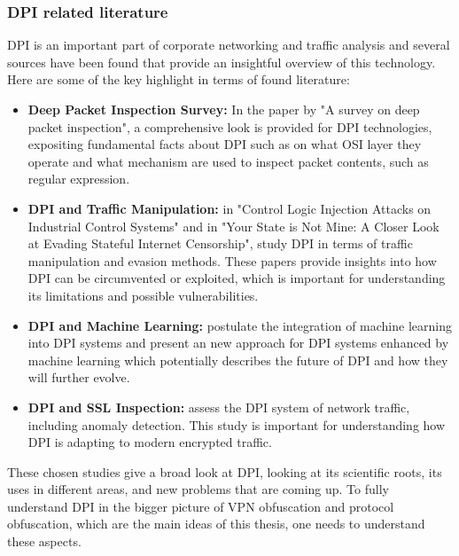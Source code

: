 \documentclass[12pt, fleqn, a4paper]{article}
\begin{document}
\subsubsection{DPI related literature}
DPI is an important part of corporate networking and traffic analysis and several sources have been found that provide an insightful overview of this technology. Here are some of the key highlight in terms of found literature:
\begin{itemize}
  \item \textbf{Deep Packet Inspection Survey:} In the paper by \cite{DPL} "A survey on deep packet inspection", a comprehensive look is provided for DPI technologies, expositing fundamental facts about DPI such as on what OSI layer they operate and what mechanism are used to inspect packet contents, such as regular expression.
  \item \textbf{DPI and Traffic Manipulation:} \cite{dpifragmentation} in "Control Logic Injection Attacks on Industrial Control Systems" and \cite{tcpevasion} in "Your State is Not Mine: A Closer Look at Evading Stateful Internet Censorship", study DPI in terms of traffic manipulation and evasion methods. These papers provide insights into how DPI can be circumvented or exploited, which is important for understanding its limitations and possible vulnerabilities.
  \item \textbf{DPI and Machine Learning:} \cite{dpiml} postulate the integration of machine learning into DPI systems and present an new approach for DPI systems enhanced by machine learning which potentially describes the future of DPI and how they will further evolve.
  \item \textbf{DPI and SSL Inspection:} \cite{dpiprobing} assess the DPI system of network traffic, including anomaly detection. This study is important for understanding how DPI is adapting to modern encrypted traffic.
\end{itemize}
These chosen studies give a broad look at DPI, looking at its scientific roots, its uses in different areas, and new problems that are coming up. To fully understand DPI in the bigger picture of VPN obfuscation and protocol obfuscation, which are the main ideas of this thesis, one needs to understand these aspects.
\end{document}
